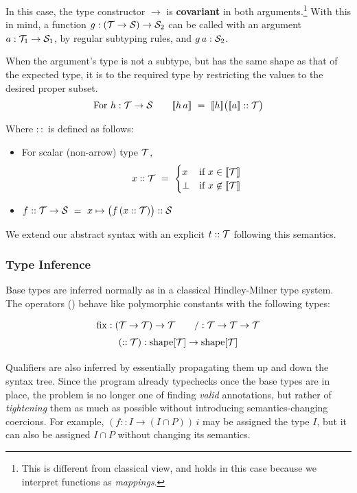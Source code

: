 In this case, the type constructor $\to$ is {\bf covariant} in both arguments.\footnote{This is different from classical view, and holds in this case because we interpret functions as \emph{mappings}.}
With this in mind, a function $g:(\T\to\S)\to \S_2$ can be called with an argument $a: \T_1\to\S_1$,
by regular subtyping rules, and $g\,a : \S_2$.

When the argument's type is not a subtype, but has the same shape as that of the expected type,
it is  to the required type by restricting the values to the desired proper subset.
%
\[\mbox{For }h:\T\to\S \qquad \semp{h\,a} ~=~ \semp{h}\big(\semp{a} :: \T\big)\]

Where $::$ is defined as follows:
\begin{itemize}
  \item For scalar (non-arrow) type $\T$, \[x :: \T ~=~ \begin{cases}x & \mbox{if }x\in\semp{\T} \\ \bot & \mbox{if }x\not\in\semp{\T}\end{cases}\]
  \item $f :: \T\to\S ~=~ x\mapsto \big(f\,(x :: \T)\big) :: \S$
\end{itemize}

\medskip
We extend our abstract syntax with an explicit 
$t::\T$ following this semantics.

\subsubsection*{Type Inference}

Base types are inferred normally as in a classical Hindley-Milner type system.
The operators () behave like polymorphic
constants with the following types:
\[\renewcommand\arraystretch{1.5}
  \begin{array}{c}
    {\fix} : (\T\to\T)\to\T \qquad {/} : \T\to\T\to\T \\
    (::\T) : \mathrm{shape}[\T]\to\mathrm{shape}[\T]
  \end{array}\]


Qualifiers are also inferred by essentially propagating them up and down the syntax tree.
Since the program already typechecks once the base types are in place, the problem is no longer
one of finding {\em valid} annotations, but rather of {\em tightening} them as much as possible
without introducing semantics-changing coercions. For example, $(f :: I\to(I\cap P))\,i$ may
be assigned the type $I$, but it can also be assigned $I\cap P$ without changing its semantics.

